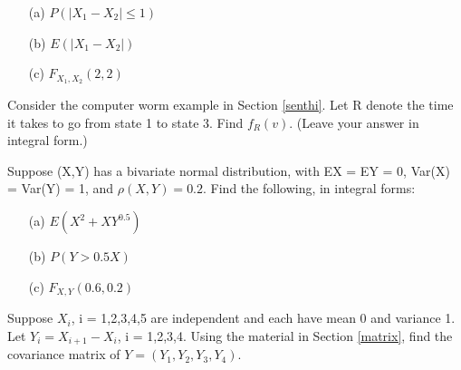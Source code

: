 \begin{itemize}

\item [(a)] $P(|X_1 - X_2| \leq 1)$

\item [(b)] $E(|X_1 - X_2|)$

\item [(c)] $F_{X_1,X_2}(2,2)$

\end{itemize}

\oneproblem
Consider the computer worm example in Section \ref{senthi}.  Let R
denote the time it takes to go from state 1 to state 3.  Find $f_R(v)$.  
(Leave your answer in integral form.)

\oneproblem
Suppose (X,Y) has a bivariate normal distribution, with EX = EY = 0,
Var(X) = Var(Y) = 1, and $\rho(X,Y) = 0.2$.  Find the following, in
integral forms:

\begin{itemize}

\item [(a)] $E(X^2+XY^{0.5})$

\item [(b)] $P(Y > 0.5X)$

\item [(c)] $F_{X,Y}(0.6,0.2)$

\end{itemize}
                      
\oneproblem
Suppose $X_i$, i = 1,2,3,4,5 are independent and each have mean 0 and   
variance 1.  Let $Y_i = X_{i+1} - X_i$, i = 1,2,3,4.  Using the 
material in Section \ref{matrix}, find the covariance matrix of 
$Y = (Y_1, Y_2, Y_3, Y_4)$.

